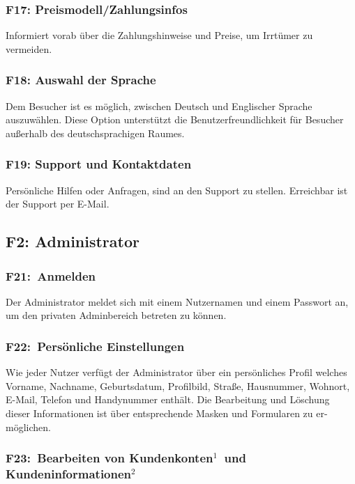 \documentclass[10pt,a4paper]{scrartcl}
\begin{document}
\subsubsection*{F17: Preismodell/Zahlungsinfos}

Informiert vorab über die Zahlungshinweise und Preise, um Irrtümer zu vermeiden.

\subsubsection*{F18: Auswahl der Sprache}

Dem Besucher ist es möglich, zwischen Deutsch und Englischer Sprache auszuwählen. Diese Option unterstützt die Benutzerfreundlichkeit für Besucher außerhalb des deutschsprachigen Raumes. 

\subsubsection*{F19: Support und Kontaktdaten}

Persönliche Hilfen oder Anfragen, sind an den Support zu stellen. Erreichbar ist der Support per E-Mail. 


\subsection{F2: Administrator}

\subsubsection*{F21: Anmelden}

Der Administrator meldet sich mit einem Nutzernamen und einem Passwort an, um den privaten Adminbereich betreten zu können.
	
\subsubsection*{F22: Persönliche Einstellungen}

Wie jeder Nutzer verfügt der Administrator über ein persönliches Profil welches Vorname, Nachname, Geburtsdatum, Profilbild, Straße, Hausnummer, Wohnort, E-Mail, Telefon und Handynummer enthält. Die Bearbeitung und Löschung dieser Informationen ist über entsprechende Masken und Formularen zu er-möglichen.

\subsubsection*{F23: Bearbeiten von Kundenkonten$^1$ und Kundeninformationen$^2$}
\end{document}
